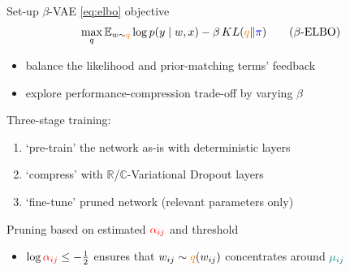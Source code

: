 \documentclass{beamer}
\newcommand{\real}{\mathbb{R}}
\newcommand{\cplx}{\mathbb{C}}
\begin{document}
\begin{frame}[c]{\insertsection}{Set-up}
  $\beta$-VAE \ref{eq:elbo} objective {\tiny \citep{higgins_beta-vae_2017}}
  \begin{equation}
  \label{eq:beta_elbo}
    \max_q
    \mathbb{E}_{w \sim {\color{orange} q}}
      \log p(y\mid w, x)  %
    - \beta \mathop{KL}({\color{orange} q}\|{\color{blue} \pi})
    \tag{$\beta$-ELBO}
  \end{equation}
  \vspace{-1em}
  \begin{itemize}
    \item balance the likelihood and prior-matching terms' feedback
    \item explore performance-compression trade-off by varying $\beta$
  \end{itemize}

  \pause
  \medskip
  Three-stage training:
  \begin{enumerate}
    \item `pre-train' the network as-is with deterministic layers
    \item `compress' with $\real$/$\cplx$-Variational Dropout layers
    \item `fine-tune' pruned network (relevant parameters only)
  \end{enumerate}

  \pause
  \medskip
  Pruning based on estimated ${\color{red} \alpha_{ij}}$ and threshold
  \begin{itemize}
    \item $
      \log{{\color{red} \alpha_{ij}}} \leq -\tfrac12
    $ ensures that $
      w_{ij} \sim {\color{orange} q}(w_{ij})
    $ concentrates around ${\color{teal} \mu_{ij}}$
  \end{itemize}

\end{frame}
\end{document}
